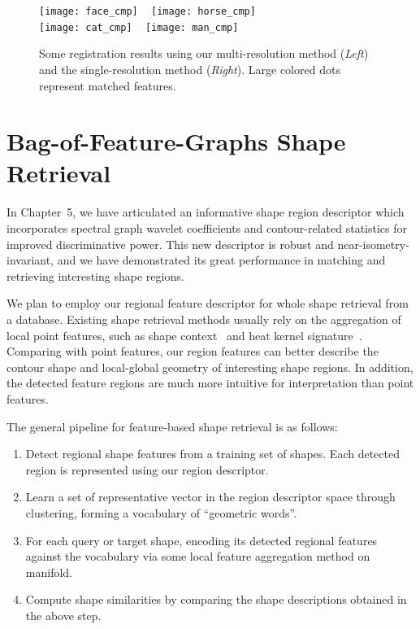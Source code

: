 \begin{figure}\centering
  \texttt{[image: face\_cmp]}
  ~
  \texttt{[image: horse\_cmp]}
  \\
  \texttt{[image: cat\_cmp]}
  ~
  \texttt{[image: man\_cmp]}
\caption[Registration results using multi-resolution method.]
 {Some registration results using our multi-resolution method (\emph{Left}) and the single-resolution method \cite{Hou:2011:TVCG} (\emph{Right}). Large colored dots represent matched features.}
\label{fig:results}
\end{figure}

\section{Bag-of-Feature-Graphs Shape Retrieval}

In Chapter~5, we have articulated an informative shape region descriptor which incorporates spectral graph wavelet coefficients
and contour-related statistics for improved discriminative power. This new descriptor is robust and near-isometry-invariant, and
we have demonstrated its great performance in matching and retrieving interesting shape regions.

We plan to employ our regional feature descriptor for whole shape retrieval from a database. Existing shape retrieval
methods usually rely on the aggregation of local point features, such as shape context~\cite{Belongie2002} and
heat kernel signature~\cite{Sun:2009:CGF}. Comparing with point features, our region features can better describe
the contour shape and local-global geometry of interesting shape regions. In addition, the detected feature regions
are much more intuitive for interpretation than point features.

The general pipeline for feature-based shape retrieval is as follows:
\begin{enumerate}
\item Detect regional shape features from a training set of shapes. Each detected region is represented using our region descriptor.
\item Learn a set of representative vector in the region descriptor space through clustering, forming a vocabulary of ``geometric words''.
\item For each query or target shape, encoding its detected regional features against the vocabulary via some local feature aggregation method
on manifold.
\item Compute shape similarities by comparing the shape descriptions obtained in the above step.
\end{enumerate}

